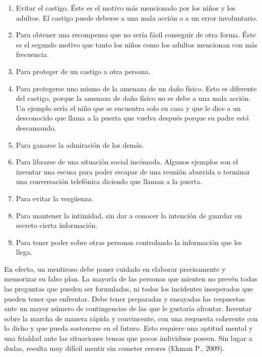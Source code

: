 \begin{enumerate}
\item Evitar el castigo. Éste es el motivo más mencionado por los niños y los adultos. El castigo puede deberse a una mala acción o a un error involuntario. 
\item Para obtener una recompensa que no sería fácil conseguir de otra forma. Éste es el segundo motivo que tanto los niños como los adultos mencionan con más frecuencia. 
\item Para proteger de un castigo a otra persona. 
\item Para protegerse uno mismo de la amenaza de un daño físico. Esto es diferente del castigo, porque la amenaza de daño físico no se debe a una mala acción. Un ejemplo sería el niño que se encuentra solo en casa y que le dice a un desconocido que llama a la puerta que vuelva después porque su padre está descansando. 
\item Para ganarse la admiración de los demás. 
\item Para librarse de una situación social incómoda. Algunos ejemplos son el inventar una escusa para poder escapar de una reunión aburrida o terminar una conversación telefónica diciendo que llaman a la puerta. 
\item Para evitar la vergüenza. 
\item Para mantener la intimidad, sin dar a  conocer la intención de guardar en secreto cierta información. 
\item Para tener poder sobre otras personas controlando la información que les llega.
\end{enumerate}

En efecto, un mentiroso debe poner cuidado en elaborar precisamente y memorizar su falso plan. La mayoría de las personas que mienten no prevén todas las preguntas que pueden ser formuladas, ni todos los incidentes inesperados que pueden tener que enfrentar. Debe tener preparadas y ensayadas las respuestas ante un mayor número de contingencias de las que le gustaría afrontar. Inventar sobre la marcha de manera rápida y convincente, con una respuesta coherente con lo dicho y que pueda sostenerse en el futuro. Esto requiere una aptitud mental y una frialdad ante las situaciones tensas que pocos individuos poseen. Sin lugar a dudas, resulta muy difícil mentir sin cometer errores (Ekman P., 2009).

